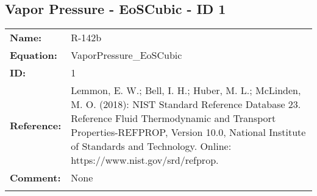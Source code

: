 \subsection{Vapor Pressure - EoSCubic - ID 1}
%
\begin{tabular}[l]{|lp{11.5cm}|}
\hline
\addlinespace

\textbf{Name:} & R-142b \\
\textbf{Equation:} & VaporPressure\_EoSCubic \\
\textbf{ID:} & 1 \\
\textbf{Reference:} & Lemmon, E. W.; Bell, I. H.; Huber, M. L.; McLinden, M. O. (2018): NIST Standard Reference Database 23. Reference Fluid Thermodynamic and Transport Properties-REFPROP, Version 10.0, National Institute of Standards and Technology. Online: https://www.nist.gov/srd/refprop. \\
\textbf{Comment:} & None \\

\addlinespace
\hline
\end{tabular}
\newline

